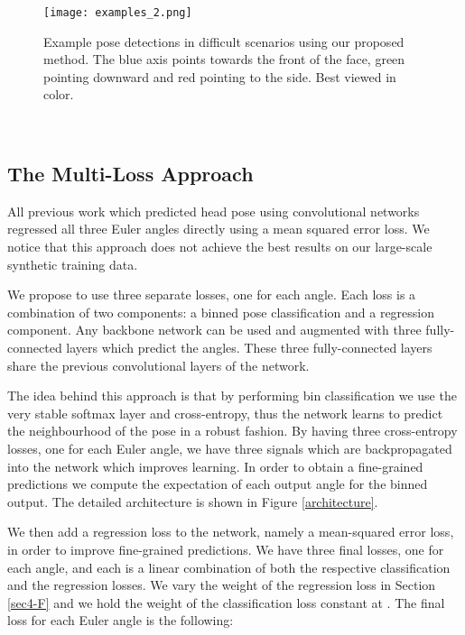 \documentclass[10pt,twocolumn,letterpaper]{article}
\begin{document}
\begin{figure}[t]
\begin{center}
   \texttt{[image: examples\_2.png]}
\end{center}
   \caption{Example pose detections in difficult scenarios using our proposed method. The blue axis points towards the front of the face, green pointing downward and red pointing to the side. Best viewed in color.}
   \label{examples_1}
\end{figure}
\

\subsection{The Multi-Loss Approach}\label{sec3-B}

All previous work which predicted head pose using convolutional networks regressed all three Euler angles directly using a mean squared error loss. We notice that this approach does not achieve the best results on our large-scale synthetic training data.

We propose to use three separate losses, one for each angle. Each loss is a combination of two components: a binned pose classification and a regression component. Any backbone network can be used and augmented with three fully-connected layers which predict the angles. These three fully-connected layers share the previous convolutional layers of the network.

The idea behind this approach is that by performing bin classification we use the very stable softmax layer and cross-entropy, thus the network learns to predict the neighbourhood of the pose in a robust fashion. By having three cross-entropy losses, one for each Euler angle, we have three signals which are backpropagated into the network which improves learning. In order to obtain a fine-grained predictions we compute the expectation of each output angle for the binned output. The detailed architecture is shown in Figure \ref{architecture}.

We then add a regression loss to the network, namely a mean-squared error loss, in order to improve fine-grained predictions. We have three final losses, one for each angle, and each is a linear combination of both the respective classification and the regression losses. We vary the weight of the regression loss in Section \ref{sec4-F} and we hold the weight of the classification loss constant at . The final loss for each Euler angle is the following:
\end{document}
